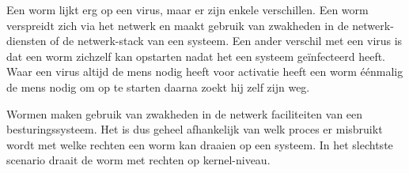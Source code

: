 Een worm lijkt erg op een virus, maar er zijn enkele verschillen. Een worm verspreidt zich via het netwerk en maakt gebruik van zwakheden in de netwerk-diensten of de netwerk-stack van een systeem. Een ander verschil met een virus is dat een worm zichzelf kan opstarten nadat het een systeem ge\"infecteerd heeft. Waar een virus altijd de mens nodig heeft voor activatie heeft een worm \'e\'enmalig de mens nodig om op te starten daarna zoekt hij zelf zijn weg.

Wormen maken gebruik van zwakheden in de netwerk faciliteiten van een besturingssysteem. Het is dus geheel afhankelijk van welk proces er misbruikt wordt met welke rechten een worm kan draaien op een systeem. In het slechtste scenario draait de worm met rechten op kernel-niveau.

